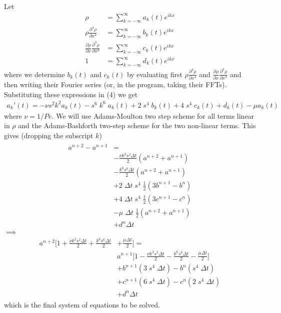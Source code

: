 \documentclass{article}[12]
\begin{document}
Let
\begin{align}
    \rho &=
    \sum_{k = -\infty}^\infty a_k(t) e^{ikx} \\
    \rho \frac{\partial^4 \rho}{\partial x^4} &=
     \sum_{k = -\infty}^\infty b_k(t) e^{ikx} \\
    \frac{\partial \rho}{\partial x} \frac{\partial^3 \rho}{\partial x^3} &=
     \sum_{k = -\infty}^\infty c_k(t) e^{ikx} \\
    1 &=
     \sum_{k = -\infty}^\infty d_k(t) e^{ikx}
\end{align}
where we determine $b_k(t)$ and $c_k(t)$ by evaluating first 
$\rho \frac{\partial^4 \rho}{\partial x^4}$ and
$\frac{\partial \rho}{\partial x} \frac{\partial^3 \rho}{\partial x^3}$ and
then writing their Fourier series (or, in the program, taking their FFTs).
Substituting these expressions in (4) we get
\begin{align}
    a_k'(t) = -\nu s^2 k^2 a_k(t)
    - s^6\;k^6\;a_k(t) +
    2 \; s^4\; b_k(t) +
    4 \; s^4 \; c_k(t) +
    d_k(t) - \mu a_k(t)
\end{align}
where $\nu = 1/Pe$. We will use Adams-Moulton two step scheme for all terms
linear in $\rho$ and the Adams-Bashforth two-step scheme for the two non-linear
terms. This gives (dropping the subscript $k$)
\begin{align}
    \begin{split}
        a^{n+2} - a^{n+1} &=\\
        &- \frac{\nu k^2 s^2 \Delta t }{2} (a^{n+2} + a^{n+1})\\
        &- \frac{k^6 s^6 \Delta t }{2} (a^{n+2} + a^{n+1})\\
        &+ 2 \; \Delta t \; s^4 \; \frac{1}{2} (3 b^{n+1} - b^n)\\
        &+ 4 \; \Delta t \; s^4 \; \frac{1}{2} (3 c^{n+1} - c^n)\\
        &- \mu \; \Delta t \; \frac{1}{2}(a^{n+2} + a^{n+1})\\
        &+ d^n \Delta t
    \end{split}
\end{align} 
$\implies$
\begin{align}
    \begin{split}
        a^{n+2}
        \Bigg[
            1 
            + \frac{\nu k^2 s^2 \Delta t }{2} 
            + \frac{k^6 s^6 \Delta t }{2}
            &+ \frac{\mu \Delta t }{2}
        \Bigg]
        =\\
        &a^{n+1}
        \Bigg[
            1 
            - \frac{\nu k^2 s^2 \Delta t }{2} 
            - \frac{k^6 s^6 \Delta t }{2}
            - \frac{\mu \Delta t }{2}
        \Bigg]\\
        &+b^{n+1} (3\;s^4\;\Delta t)
        -b^{n} (s^4\;\Delta t)\\
        &+c^{n+1} (6\;s^4\;\Delta t)
        -c^{n} (2 \; s^4\;\Delta t)\\
        &+d^n \Delta t
    \end{split}
\end{align}
which is the final system of equations to be solved.
\end{document}
